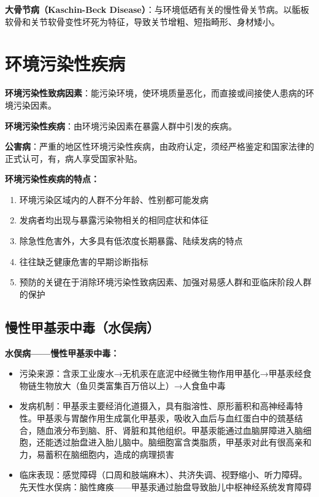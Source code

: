 \documentclass[10pt,a4paper,oneside]{ctexbook}
\begin{document}
\textbf{大骨节病（Kaschin-Beck Disease）}：与环境低硒有关的慢性骨关节病。以骺板软骨和关节软骨变性坏死为特征，导致关节增粗、短指畸形、身材矮小。

\section{环境污染性疾病}

\begin{defbox}
\textbf{环境污染性致病因素}：能污染环境，使环境质量恶化，而直接或间接使人患病的环境污染因素。

\textbf{环境污染性疾病}：由环境污染因素在暴露人群中引发的疾病。

\textbf{公害病}：严重的地区性环境污染性疾病，由政府认定，须经严格鉴定和国家法律的正式认可，有，病人享受国家补贴。
\end{defbox}

\textbf{环境污染性疾病的特点：}
\begin{enumerate}[leftmargin=*]
    \item 环境污染区域内的人群不分年龄、性别都可能发病
    \item 发病者均出现与暴露污染物相关的相同症状和体征
    \item 除急性危害外，大多具有低浓度长期暴露、陆续发病的特点
    \item 往往缺乏健康危害的早期诊断指标
    \item 预防的关键在于消除环境污染性致病因素、加强对易感人群和亚临床阶段人群的保护
\end{enumerate}

\subsection{慢性甲基汞中毒（水俣病）}

\begin{keybox}
\textbf{水俣病——慢性甲基汞中毒：}
\begin{itemize}[leftmargin=*]
    \item 污染来源：含汞工业废水→无机汞在底泥中经微生物作用甲基化→甲基汞经食物链生物放大（鱼贝类富集百万倍以上）→人食鱼中毒
    \item 发病机制：甲基汞主要经消化道摄入，具有脂溶性、原形蓄积和高神经毒特性。甲基汞与胃酸作用生成氯化甲基汞，吸收入血后与血红蛋白中的巯基结合，随血液分布到脑、肝、肾脏和其他组织。甲基汞能通过血脑屏障进入脑细胞，还能透过胎盘进入胎儿脑中。脑细胞富含类脂质，甲基汞对此有很高亲和力，易蓄积在脑细胞内，造成的病理损害
    \item 临床表现：感觉障碍（口周和肢端麻木）、共济失调、视野缩小、听力障碍。先天性水俣病：脑性瘫痪——甲基汞通过胎盘导致胎儿中枢神经系统发育障碍
\end{itemize}
\end{keybox}
\end{document}
